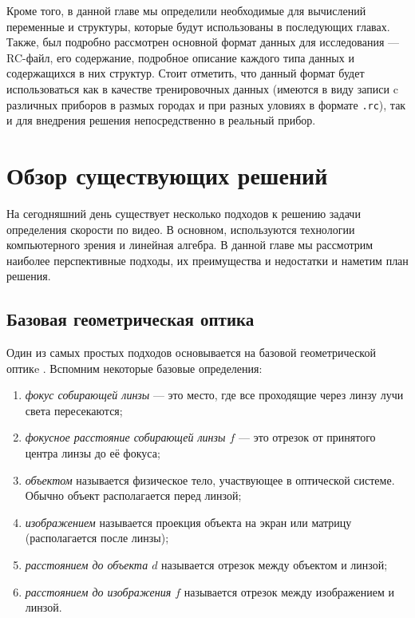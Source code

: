 \documentclass[specification,annotation,times]{itmo-student-thesis}
\begin{document}
	Кроме того, в данной главе мы определили необходимые для вычислений переменные и структуры, которые будут использованы в последующих главах. Также, был подробно рассмотрен основной формат данных для исследования --- RC-файл, его содержание, подробное описание каждого типа данных и содержащихся в них структур. Стоит отметить, что данный формат будет использоваться как в качестве тренировочных данных (имеются в виду записи c различных приборов в размых городах и при разных уловиях в формате \texttt{.rc}), так и для внедрения решения непосредственно в реальный прибор.
	
	\chapter{Обзор существующих решений}\label{chp2}
	На сегодняшний день существует несколько подходов к решению задачи определения скорости по видео. В основном, используются технологии компьютерного зрения и линейная алгебра. В данной главе мы рассмотрим наиболее перспективные подходы, их преимущества и недостатки и наметим план решения.
	\startrelatedwork
	\section{Базовая геометрическая оптика}
	Один из самых простых подходов \cite{5228496} основывается на базовой геометрической оптикe \cite{Wilkinson2012}. Вспомним некоторые базовые определения:
	
	\begin{enumerate}
		\item \textit{фокус собирающей линзы} --- это место, где все проходящие через линзу лучи света пересекаются;
		\item \textit{фокусное расстояние собирающей линзы $ f $} --- это  отрезок от принятого центра линзы до её фокуса;
		\item \textit{объектом}  называется физическое тело, участвующее в оптической системе. Обычно объект располагается перед линзой;
		\item \textit{изображением}  называется проекция объекта на экран или матрицу (располагается после линзы);
		\item \textit{расстоянием до объекта $ d $} называется отрезок между объектом и линзой;
		\item \textit{расстоянием до изображения $ f $} называется отрезок между изображением и линзой.
	\end{enumerate}
	
\end{document}
